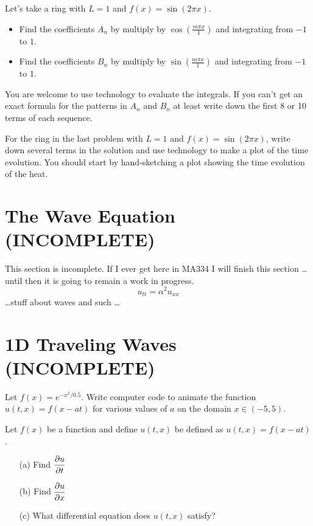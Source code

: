 \begin{problem}
    Let's take a ring with $L = 1$ and $f(x) = \sin(2 \pi x)$.  
    \begin{itemize}
        \item Find the coefficients $A_n$ by multiply by $\cos\left( \frac{m\pi x}{1}
            \right)$ and integrating from $-1$ to $1$.
        \item Find the coefficients $B_n$ by multiply by $\sin\left( \frac{m\pi x}{1}
            \right)$ and integrating from $-1$ to $1$.
    \end{itemize}
    You are welcome to use technology to evaluate the integrals.  If you can't get an
    exact formula for the patterns in $A_n$ and $B_n$ at least write down the first 8 or
    10 terms of each sequence.
\end{problem}

\begin{problem}
    For the ring in the last problem with $L=1$ and $f(x) = \sin(2\pi x)$, write down
    several terms in the solution and use technology to make a plot of the time evolution.
    You should start by hand-sketching a plot showing the time evolution of the heat.
\end{problem}



\section{The Wave Equation (INCOMPLETE)}
This section is incomplete. If I ever get here in MA334 I will finish this section \dots
until then it is going to remain a work in progress.
\[ u_{tt} = \alpha^2 u_{xx} \]
\ldots stuff about waves and such \ldots


\section{1D Traveling Waves (INCOMPLETE)}
\begin{problem}
    Let $f(x) = e^{-x^2/0.5}$.  Write computer code to animate the function $u(t,x) =
    f(x-at)$ for various values of $a$ on the domain $x \in (-5,5)$.
\end{problem}

\begin{problem}
    Let $f(x)$ be a function and define $u(t,x)$ be defined as $u(t,x) = f(x-at)$.  
    \begin{enumerate}
        \item[(a)] Find $\displaystyle \frac{\partial u}{\partial t}$
        \item[(b)] Find $\displaystyle \frac{\partial u}{\partial x}$
        \item[(c)] What differential equation does $u(t,x)$ satisfy?
    \end{enumerate}
\end{problem}
\solution{
    \[ u_t = -a u_x \]
}

